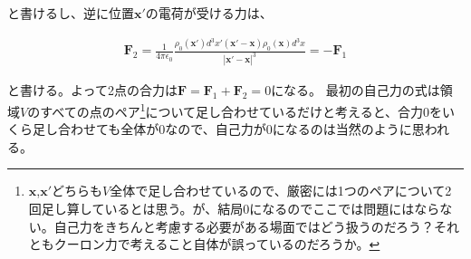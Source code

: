 \documentclass[a4j,12pt,uplatex,dvipdfmx]{jsreport}
\begin{document}
と書けるし、逆に位置$\bm{x'}$の電荷が受ける力は、

\begin{eqnarray*}
  \bm{F}_2 = \frac{1}{4 \pi \epsilon_0}  \frac{\rho_0(\bm{x'}) d^3 x' (\bm{x'} - \bm{x}) \rho_0(\bm{x}) d^3 x}{| \bm{x'} - \bm{x} |^3} = - \bm{F}_1
\end{eqnarray*}

と書ける。よって2点の合力は$\bm{F} = \bm{F}_1 + \bm{F}_2 = 0$になる。
最初の自己力の式は領域$V$のすべての点のペア\footnote{$\bm{x}$,$\bm{x'}$どちらも$V$全体で足し合わせているので、厳密には1つのペアについて2回足し算しているとは思う。が、結局$0$になるのでここでは問題にはならない。自己力をきちんと考慮する必要がある場面ではどう扱うのだろう？それともクーロン力で考えること自体が誤っているのだろうか。}について足し合わせているだけと考えると、合力$0$をいくら足し合わせても全体が$0$なので、自己力が$0$になるのは当然のように思われる。
\end{document}
